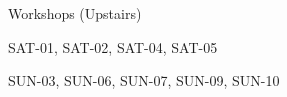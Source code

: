 \documentclass{article}
\newcommand{\room}[1]{
    \noindent
    #1
    \vspace{.2in}

}
\begin{document}
\rssheader[2in]

\vfill

\fontsize{50pt}{60pt}
\selectfont

\begin{center}
    \room{Workshops (Upstairs)}
\fontsize{18pt}{24pt} \selectfont
    \room{SAT-01, SAT-02, SAT-04, SAT-05}
    \room{SUN-03, SUN-06, SUN-07, SUN-09, SUN-10}
\end{center}

\rssarrowright

\vfill
\end{document}
